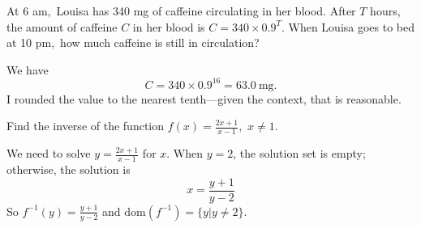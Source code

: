 \documentclass[12pt,fleqn,answers]{exam}
\newcommand{\dom}{\mbox{dom}}
\newcommand\AM{{\sc am}}
\newcommand\PM{{\sc pm}}
\begin{document}
\begin{questions}
\question [2]  At 6 \AM,\, Louisa has 340 mg of caffeine circulating 
in her blood. After $T$ hours, the amount of caffeine $C$ in her blood is
\(
     C = 340  \times  0.9^T
\).
When Louisa goes to bed at 10 \PM,\, how much caffeine is
still in circulation?
\begin{solution}[1.5in] We have
    \begin{equation*}
        C = 340 \times 0.9^{16} = \SI{63.0}{\milli\gram}.
    \end{equation*}
I rounded the value to the nearest tenth---given the context, that
is reasonable.
\end{solution}


\question Find the inverse of the function $f(x) = \frac{2 x + 1}{x-1}, \,\, x \neq 1$.
\begin{solution}[2.5in]
    We need to solve $y = \frac{2 x + 1}{x-1}$ for $x$. 
    When $y = 2$, the solution set is empty; otherwise, the
    solution is 
    \begin{equation*}
         x = \frac{y+1}{y-2}                           
    \end{equation*}
    So $f^{-1}(y) = \frac{y+1}{y-2}$ and $\dom(f^{-1}) = \{y | y \neq 2 \}$.
        
 
\end{solution}
\end{questions}
%
\end{document}
